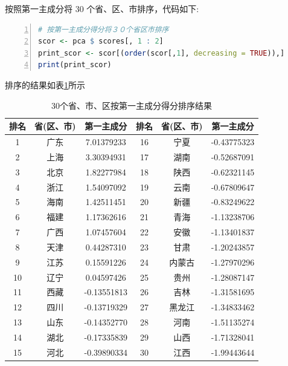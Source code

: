 \documentclass{ctexrep}
\begin{document}
按照第一主成分将 30 个省、区、市排序，代码如下:
\begin{lstlisting}[language=R, numbers=left, numberstyle=\tiny]
# 按第一主成分得分将３０个省区市排序
scor <- pca $ scores[, 1 : 2]
print_scor <- scor[(order(scor[,1], decreasing = TRUE)),]
print(print_scor)
\end{lstlisting}
排序的结果如表\ref{tab:ex452}所示
\begin{table}[ht!]
\begin{center}
\begin{tabular}{ccc|ccc}
\hline
排名 & 省(区、市) & 第一主成分 & 排名 & 省(区、市) & 第一主成分 \\
\hline
1 & 广东 & 7.01379233 & 16 & 宁夏 & -0.43775323 \\
2 & 上海 & 3.30394931 & 17 & 湖南 & -0.52687091 \\
3 & 北京 & 1.82277984 & 18 & 陕西 & -0.62321145 \\
4 & 浙江 & 1.54097092 & 19 & 云南 & -0.67809647 \\
5 & 海南 & 1.42511451 & 20 & 新疆 & -0.83249622 \\
6 & 福建 & 1.17362616 & 21 & 青海 & -1.13238706 \\
7 & 广西 & 1.07457604 & 22 & 安徽 & -1.13401837 \\
8 & 天津 & 0.44287310 & 23 & 甘肃 & -1.20243857 \\
9 & 江苏 & 0.15591226 & 24 & 内蒙古 & -1.27970296 \\
10 & 辽宁 & 0.04597426 & 25 & 贵州 & -1.28087147 \\
11 & 西藏 & -0.13551813 & 26 & 吉林 & -1.31581695 \\
12 & 四川 & -0.13719329 & 27 & 黑龙江 & -1.34833462 \\
13 & 山东 & -0.14352770 & 28 & 河南 & -1.51135274 \\
14 & 湖北 & -0.17335839 & 29 & 山西 & -1.71328041 \\
15 & 河北 & -0.39890334 & 30 & 江西 & -1.99443644 \\
\hline
\end{tabular}
\end{center}
\caption{30个省、市、区按第一主成分得分排序结果}
\label{tab:ex452}
\end{table}
\end{document}
